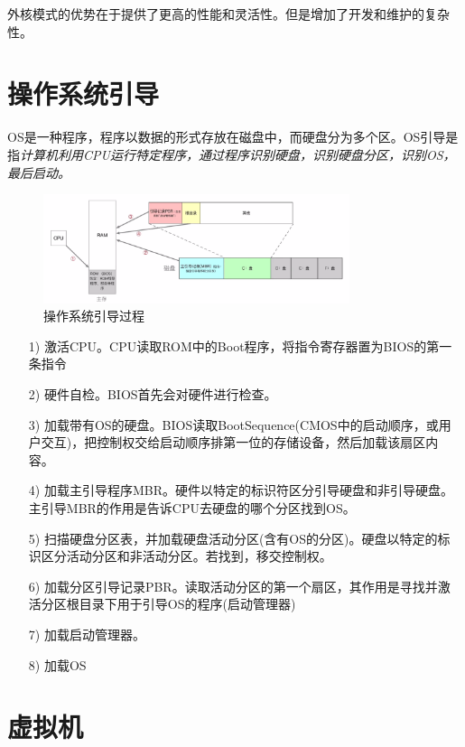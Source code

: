     外核模式的优势在于提供了更高的性能和灵活性。但是增加了开发和维护的复杂性。

\section{操作系统引导}

    OS是一种程序，程序以数据的形式存放在磁盘中，而硬盘分为多个区。OS引导是指\emph{计算机利用CPU运行特定程序，通过程序识别硬盘，识别硬盘分区，识别OS，最后启动。}

\begin{figure}[!htbp]
    \centering
    \includegraphics[width=0.8\textwidth]{image/chapter01/操作系统引导.png}
    \caption{操作系统引导过程}
\end{figure}

\begin{itemize}
    \item [1)] 激活CPU。CPU读取ROM中的Boot程序，将指令寄存器置为BIOS的第一条指令
    \item [2)] 硬件自检。BIOS首先会对硬件进行检查。
    \item [3)] 加载带有OS的硬盘。BIOS读取BootSequence(CMOS中的启动顺序，或用户交互)，把控制权交给启动顺序排第一位的存储设备，然后加载该扇区内容。
    \item [4)] 加载主引导程序MBR。硬件以特定的标识符区分引导硬盘和非引导硬盘。主引导MBR的作用是告诉CPU去硬盘的哪个分区找到OS。
    \item [5)] 扫描硬盘分区表，并加载硬盘活动分区(含有OS的分区)。硬盘以特定的标识区分活动分区和非活动分区。若找到，移交控制权。
    \item [6)] 加载分区引导记录PBR。读取活动分区的第一个扇区，其作用是寻找并激活分区根目录下用于引导OS的程序(启动管理器)
    \item [7)] 加载启动管理器。
    \item [8)] 加载OS
\end{itemize}

\section{虚拟机}


